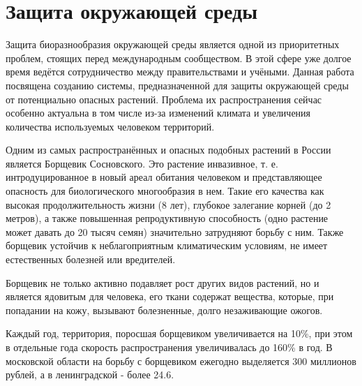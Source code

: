 \section{Защита окружающей среды}

\tab
Защита биоразнообразия окружающей среды является одной из приоритетных проблем, стоящих перед международным сообществом.
В этой сфере уже долгое время ведётся сотрудничество между правительствами и учёными\cite{un-biodiv}.
Данная работа посвящена созданию системы, предназначенной для защиты окружающей среды от потенциально опасных растений.
Проблема их распространения сейчас особенно актуальна в том числе из-за изменений климата\cite{poisonous-ivy} и увеличения количества используемых человеком территорий.

\nwln
Одним из самых распространённых и опасных подобных растений в России является Борщевик Сосновского\cite{heracleum-desc}.
Это растение инвазивное, т. е. интродуцированное в новый ареал обитания человеком и представляющее опасность для биологического многообразия в нем.
Такие его качества как высокая продолжительность жизни (8 лет), глубокое залегание корней (до 2 метров), а также повышенная репродуктивную способность (одно растение может давать до 20 тысяч семян) значительно затрудняют борьбу с ним.
Также борщевик устойчив к неблагоприятным климатическим условиям, не имеет естественных болезней или вредителей.

\nwln
Борщевик не только активно подавляет рост других видов растений, но и является ядовитым для человека, его ткани содержат вещества, которые, при попадании на кожу, вызывают болезненные, долго незаживающие ожогов.

\nwln
Каждый год, территория, поросшая борщевиком увеличивается на 10\%\cite{kommersant, er-initiative}, при этом в отдельные года скорость распространения увеличивалась до 160\%\cite{business-online} в год.
В московской области на борьбу с борщевиком ежегодно выделяется 300 миллионов рублей\cite{mos-expenses}, а в ленинградской - более 24.6\cite{len-expenses}.

